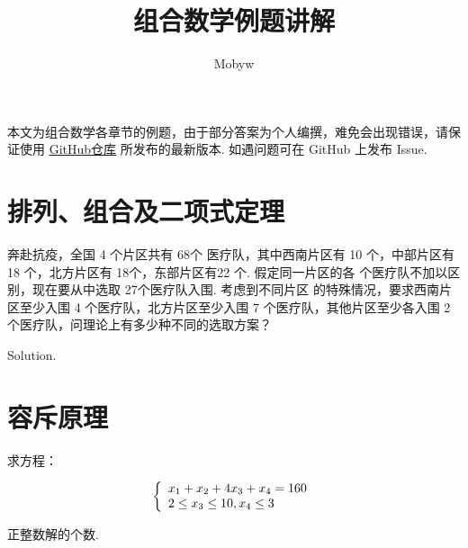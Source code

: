 \documentclass[cn, hazy, blue, normal, 12pt]{elegantnote}
\title{组合数学例题讲解}
\author{Mobyw}
\date{\zhtoday}
\begin{document}
\maketitle



本文为组合数学各章节的例题，由于部分答案为个人编撰，难免会出现错误，请保证使用 \href{https://github.com/mobyw/MasterCourseNotes/CombinatorialMathematics}{GitHub仓库} 所发布的最新版本. 如遇问题可在 GitHub 上发布 Issue.


\section{排列、组合及二项式定理}

\begin{exercise}

    奔赴抗疫，全国 4 个片区共有 68个 医疗队，其中西南片区有 10 个，中部片区有 18 个，北方片区有 18个，东部片区有22 个. 假定同一片区的各 个医疗队不加以区别，现在要从中选取 27个医疗队入围. 考虑到不同片区 的特殊情况，要求西南片区至少入围 4 个医疗队，北方片区至少入围 7 个医疗队，其他片区至少各入围 2 个医疗队，问理论上有多少种不同的选取方案？

\end{exercise}

\begin{solution}[print=true]

    Solution.

\end{solution}


\section{容斥原理}

\begin{exercise}

    求方程：

    \begin{equation}
        \notag
        \left\{\begin{array}{l}
            x_{1}+x_{2}+4 x_{3}+x_{4}=160 \\
            2 \leq x_{3} \leq 10, x_{4} \leq 3
        \end{array}\right.
    \end{equation}

    正整数解的个数.

\end{exercise}
\end{document}
